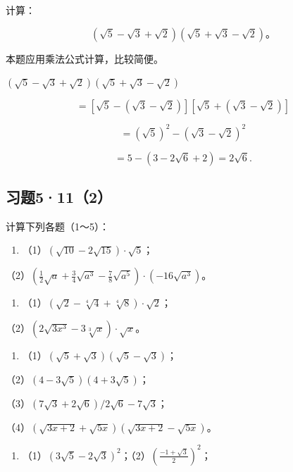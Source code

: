 计算：

\[
(\sqrt {5} - \sqrt {3} + \sqrt {2}) (\sqrt {5} + \sqrt {3} - \sqrt {2})\text{。}
\]

 本题应用乘法公式计算，比较简便。

\((\sqrt{5} - \sqrt{3} + \sqrt{2})(\sqrt{5} + \sqrt{3} - \sqrt{2})\)

\[
= [ \sqrt {5} - (\sqrt {3} - \sqrt {2}) ] [ \sqrt {5} + (\sqrt {3} - \sqrt {2}) ]
\]

\[
= (\sqrt {5}) ^ {2} - (\sqrt {3} - \sqrt {2}) ^ {2}
\]

\[
= 5 - (3 - 2 \sqrt {6} + 2) = 2 \sqrt {6}.
\]

\subsection{习题5·11（2）}

计算下列各题（1～5）：

\begin{enumerate}
\item
  （1）\((\sqrt{10} - 2\sqrt{15}) \cdot \sqrt{5}\)；
\end{enumerate}

（2）\(\left(\frac{1}{2}\sqrt{a} + \frac{3}{4}\sqrt{a^3} - \frac{7}{8}\sqrt{a^5}\right) \cdot (-16\sqrt{a^3})\)。

\begin{enumerate}[start=2]
\item
  （1）\((\sqrt{2} - \sqrt[4]{4} + \sqrt[4]{8}) \cdot \sqrt{2}\)；
\end{enumerate}

（2）\((2\sqrt{3x^3} - 3\sqrt[3]{x})\cdot \sqrt{x}\)。

\begin{enumerate}[start=3]
\item
  （1）\((\sqrt{5} + \sqrt{3})(\sqrt{5} - \sqrt{3})\)；
\end{enumerate}

（2）\((4 - 3\sqrt{5})(4 + 3\sqrt{5})\)；

（3）\((7\sqrt{3} + 2\sqrt{6}) / 2\sqrt{6} - 7\sqrt{3}\)；

（4）\((\sqrt{3x + 2} + \sqrt{5x})(\sqrt{3x + 2} - \sqrt{5x})\)。

\begin{enumerate}[start=4]
\item
  （1）\((3\sqrt{5} - 2\sqrt{3})^2\)；（2）\(\left(\frac{-1 + \sqrt{3}}{2}\right)^2\)；
\end{enumerate}

